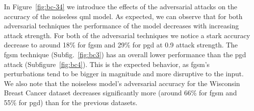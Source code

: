 In Figure~\ref{fig:bc-34} we introduce the effects of the
adversarial attacks on the accuracy of the noiseless \ac{qml}
model. As expected, we can observe that for both adversarial
techniques the performance of the model decreases with increasing
attack strength. For both of the adversarial techniques
we notice a stark accuracy decrease to around 18\% for \ac{fgsm}
and 29\% for \ac{pgd} at 0.9 attack strength. The \ac{fgsm} technique
(Subfig.~\ref{fig:bc3}) has an overall lower performance than the
\ac{pgd} attack (Subfigure~\ref{fig:bc4}). This is the expected
behavior, as \ac{fgsm}'s perturbations tend to be bigger in
magnitude and more disruptive to the input. We also note that the
noiseless model's adversarial accuracy for the Wisconsin Breast
Cancer dataset decreases significantly more (around 66\% for
\ac{fgsm} and 55\% for \ac{pgd}) than for the previous datasets. \

